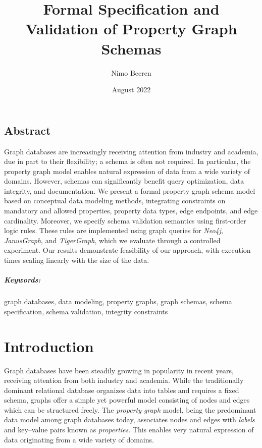 \documentclass{report}
\title{Formal Specification and Validation of Property Graph Schemas}
\author{Nimo Beeren}
\date{August 2022}
\theoremstyle{definition}
\begin{document}


\renewcommand{\thepage}{\roman{page}}

\section*{Abstract}

Graph databases are increasingly receiving attention from industry and academia, due in part to their flexibility; a schema is often not required. In particular, the property graph model enables natural expression of data from a wide variety of domains. However, schemas can significantly benefit query optimization, data integrity, and documentation. We present a formal property graph schema model based on conceptual data modeling methods, integrating constraints on mandatory and allowed properties, property data types, edge endpoints, and edge cardinality. Moreover, we specify schema validation semantics using first-order logic rules. These rules are implemented using graph queries for \emph{Neo4j}, \emph{JanusGraph}, and \emph{TigerGraph}, which we evaluate through a controlled experiment. Our results demonstrate feasibility of our approach, with execution times scaling linearly with the size of the data.

\paragraph{Keywords:} graph databases, data modeling, property graphs, graph schemas, schema specification, schema validation, integrity constraints

\tableofcontents
\listoffigures
\listoftables
\lstlistoflistings
{}

\chapter{Introduction}
\setcounter{page}{1}
\renewcommand{\thepage}{\arabic{page}}

Graph databases have been steadily growing in popularity in recent years, receiving attention from both industry and academia. While the traditionally dominant relational database organizes data into tables and requires a fixed schema, graphs offer a simple yet powerful model consisting of nodes and edges which can be structured freely. The \emph{property graph} model, being the predominant data model among graph databases today, associates nodes and edges with \emph{labels} and key--value pairs known as \emph{properties}. This enables very natural expression of data originating from a wide variety of domains.
\end{document}
